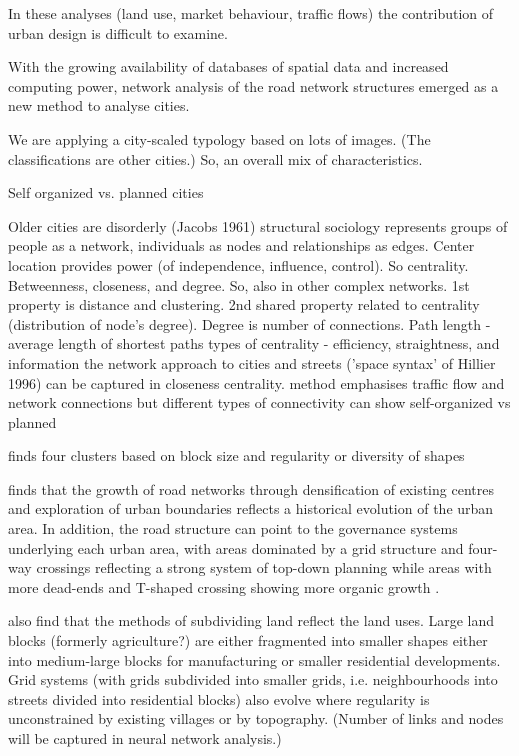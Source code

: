 \documentclass[10pt,letterpaper]{article}
\begin{document}
In these analyses (land use, market behaviour, traffic flows) the contribution of urban design is difficult to examine.

With the growing availability of databases of spatial data and increased computing power, network analysis of the road network structures emerged as a new method to analyse cities.


We are applying a city-scaled typology based on lots of images. (The classifications are other cities.) So, an overall mix of characteristics.

Self organized vs. planned cities

Older cities are disorderly (Jacobs 1961)
\cite{Porta2006a} structural sociology represents groups of people as a network, individuals as nodes and relationships as edges. Center location provides power (of independence, influence, control). So centrality. Betweenness, closeness, and degree. So, also in other complex networks. 1st property is distance and clustering. 2nd shared property related to centrality (distribution of node's degree). Degree is number of connections.
Path length - average length of shortest paths
types of centrality - efficiency, straightness, and information
the network approach to cities and streets ('space syntax' of Hillier 1996)  can be captured in closeness centrality.
method emphasises traffic flow and network connections but different types of connectivity can show self-organized vs planned

\cite{Louf2014} finds four clusters based on block size and regularity or diversity of shapes

\cite{Strano2012} finds that the growth of road networks through densification of existing centres and exploration of urban boundaries reflects a historical evolution of the urban area. In addition, the road structure can point to the governance systems underlying each urban area, with areas dominated by a grid structure and four-way crossings reflecting a strong system of top-down planning \cite{Courtat2011} while areas with more dead-ends and T-shaped crossing showing more organic growth \cite{Cardillo2006}.

\cite{Strano2012} also find that the methods of subdividing land reflect the land uses. Large land blocks (formerly agriculture?) are either fragmented into smaller shapes either into medium-large blocks for manufacturing or smaller residential developments. Grid systems (with grids subdivided into smaller grids, i.e. neighbourhoods into streets divided into residential blocks) also evolve where regularity is unconstrained by existing villages or by topography. (Number of links and nodes will be captured in neural network analysis.)
\end{document}

